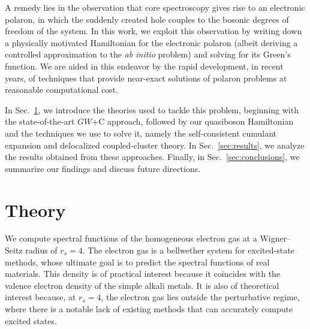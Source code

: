 \documentclass[letterpaper]{article}
\begin{document}
A remedy lies in the observation that core spectroscopy gives rise to an electronic polaron, in which the suddenly created hole couples to the bosonic degrees of freedom of the system. In this work, we exploit this observation by writing down a physically motivated Hamiltonian for the electronic polaron (albeit deriving a controlled approximation to the \emph{ab initio} problem) and solving for its Green's function. We are aided in this endeavor by the rapid development, in recent years, of techniques that provide near-exact solutions of polaron problems at reasonable computational cost.

In Sec.~\ref{sec:theory}, we introduce the theories used to tackle this problem, beginning with the state-of-the-art $GW$+C approach, followed by our quasiboson Hamiltonian and the techniques we use to solve it, namely the self-consistent cumulant expansion and delocalized coupled-cluster theory. In Sec.~\ref{sec:results}, we analyze the results obtained from these approaches. Finally, in Sec.~\ref{sec:conclusions}, we summarize our findings and discuss future directions.

\section{Theory}
\label{sec:theory}
We compute spectral functions of the homogeneous electron gas at a Wigner--Seitz radius of $r_s = 4$. The electron gas is a bellwether system for excited-state methods, whose ultimate goal is to predict the spectral functions of real materials. This density is of practical interest because it coincides with the valence electron density of the simple alkali metals. It is also of theoretical interest because, at $r_s = 4$, the electron gas lies outside the perturbative regime, where there is a notable lack of existing  methods that can accurately compute excited states.
\end{document}
